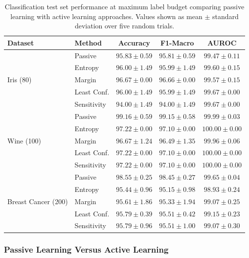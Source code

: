 \documentclass[conference]{IEEEtran}
\begin{document}
\begin{table}[t]
\centering
\caption{Classification test set performance at maximum label budget comparing passive learning with active learning approaches. Values shown as mean $\pm$ standard deviation over five random trials.}
\label{tab:cls-results}
\begin{tabular}{llccc}
\toprule
Dataset & Method & Accuracy & F1-Macro & AUROC \\
\midrule
\multirow{5}{*}{Iris (80)} & Passive & $\mathbf{95.83 \pm 0.59}$ & $\mathbf{95.81 \pm 0.59}$ & $99.47 \pm 0.11$ \\
 & Entropy & $96.00 \pm 1.49$ & $95.99 \pm 1.49$ & $99.60 \pm 0.15$ \\
 & Margin & $\mathbf{96.67 \pm 0.00}$ & $\mathbf{96.66 \pm 0.00}$ & $99.57 \pm 0.15$ \\
 & Least Conf. & $96.00 \pm 1.49$ & $95.99 \pm 1.49$ & $\mathbf{99.67 \pm 0.00}$ \\
 & Sensitivity & $94.00 \pm 1.49$ & $94.00 \pm 1.49$ & $\mathbf{99.67 \pm 0.00}$ \\
\midrule
\multirow{5}{*}{Wine (100)} & Passive & $\mathbf{99.16 \pm 0.59}$ & $\mathbf{99.15 \pm 0.58}$ & $\mathbf{99.99 \pm 0.03}$ \\
 & Entropy & $97.22 \pm 0.00$ & $97.10 \pm 0.00$ & $100.00 \pm 0.00$ \\
 & Margin & $96.67 \pm 1.24$ & $96.49 \pm 1.35$ & $99.96 \pm 0.06$ \\
 & Least Conf. & $97.22 \pm 0.00$ & $97.10 \pm 0.00$ & $100.00 \pm 0.00$ \\
 & Sensitivity & $97.22 \pm 0.00$ & $97.10 \pm 0.00$ & $100.00 \pm 0.00$ \\
\midrule
\multirow{5}{*}{Breast Cancer (200)} & Passive & $\mathbf{98.55 \pm 0.25}$ & $\mathbf{98.45 \pm 0.27}$ & $\mathbf{99.65 \pm 0.04}$ \\
 & Entropy & $95.44 \pm 0.96$ & $95.15 \pm 0.98$ & $98.93 \pm 0.24$ \\
 & Margin & $95.61 \pm 1.86$ & $95.33 \pm 1.94$ & $99.07 \pm 0.25$ \\
 & Least Conf. & $95.79 \pm 0.39$ & $95.51 \pm 0.42$ & $99.15 \pm 0.23$ \\
 & Sensitivity & $95.79 \pm 0.96$ & $95.51 \pm 1.00$ & $99.07 \pm 0.30$ \\
\bottomrule
\end{tabular}
\end{table}

\subsubsection{Passive Learning Versus Active Learning}
\end{document}
